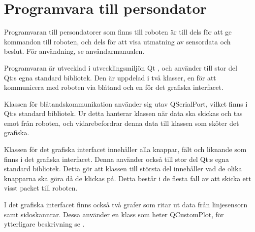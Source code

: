 \section{Programvara till persondator}
Programvaran till persondatorer som finns till roboten är till dels för att ge kommandon till roboten, och dels för att visa utmatning av sensordata och beslut. För användning, se användarmanualen.

Programvaran är utvecklad i utvecklingsmiljön Qt \cite{qt}, och använder till stor del Qt:s egna standard bibliotek. Den är uppdelad i två klasser, en för att kommunicera med roboten via blåtand och en för det grafiska interfacet.

Klassen för blåtandskommunikation använder sig utav QSerialPort, vilket finns i Qt:s standard bibliotek. Ur detta hanterar klassen när data ska skickas och tas emot från roboten, och vidarebefordrar denna data till klassen som sköter det grafiska.

Klassen för det grafiska interfacet innehåller alla knappar, fält och liknande som finns i det grafiska interfacet. Denna använder också till stor del Qt:s egna standard bibliotek. Detta gör att klassen till största del innehåller vad de olika knapparna ska göra då de klickas på. Detta består i de flesta fall av att skicka ett visst packet till roboten.

I det grafiska interfacet finns också två grafer som ritar ut data från linjesensorn samt sidoskannrar. Dessa använder en klass som heter QCustomPlot, för ytterligare beskrivning se \cite{qcustomplot}.  
